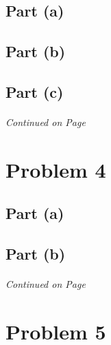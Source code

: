 \documentclass[11pt]{article}
\begin{document}
\subsection*{Part (a)}
\subsection*{Part (b)}
\subsection*{Part (c)}
\label{pg:end-of-p3}

%
\paragraph{} \emph{Continued on Page \pageref{pg:p3-continuation}}




\newpage

\section*{Problem 4}

\subsection*{Part (a)}
\subsection*{Part (b)}

\label{pg:end-of-p4}

%
\paragraph{} \emph{Continued on Page \pageref{pg:p4-continuation}}


\newpage

\section*{Problem 5}
\label{pg:end-of-p5}
\end{document}
